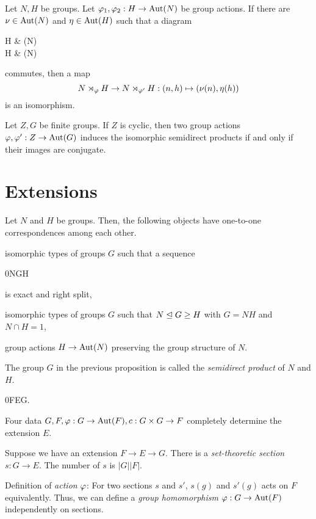 \documentclass{../note}
\begin{document}
\begin{lem}
Let $N,H$ be groups.
Let $\varphi_1,\varphi_2:H\to\operatorname{Aut}(N)$ be group actions.
If there are $\nu\in\operatorname{Aut}(N)$ and $\eta\in\operatorname{Aut}(H)$ such that a diagram
\begin{cd}
H  & \Aut(N) \\
H  & \Aut(N)
\end{cd}
commutes, then a map
\[N\rtimes_\varphi H\to N\rtimes_{\varphi'}H:(n,h)\mapsto(\nu(n),\eta(h))\]
is an isomorphism.
\end{lem}
\begin{lem}
Let $Z,G$ be finite groups.
If $Z$ is cyclic, then two group actions $\varphi,\varphi':Z\to\operatorname{Aut}(G)$ induces the isomorphic semidirect products if and only if their images are conjugate.
\end{lem}


\section{Extensions}

\begin{prop}
Let $N$ and $H$ be groups.
Then, the following objects have one-to-one correspondences among each other.
\begin{parts}
\item isomorphic types of groups $G$ such that a sequence \begin{es}0\>N\>G\>H\end{es} is exact and right split,
\item isomorphic types of groups $G$ such that $N\trianglelefteq G\ge H$ with $G=NH$ and $N\cap H=1$,
\item group actions $H\to\operatorname{Aut}(N)$ preserving the group structure of $N$.
\end{parts}
\end{prop}
\begin{defn}
The group $G$ in the previous proposition is called the \emph{semidirect product} of $N$ and $H$.
\end{defn}


\begin{es}
0\>F\>E\>G.
\end{es}
Four data $G,F,\varphi:G\to\operatorname{Aut}(F),c:G\times G\to F$ completely determine the extension $E$.

Suppose we have an extension $F\to E\to G$.
There is a \emph{set-theoretic section} $s:G\to E$.
The number of $s$ is $|G||F|$.

Definition of \emph{action} $\varphi$:
For two sections $s$ and $s'$, $s(g)$ and $s'(g)$ acts on $F$ equivalently.
Thus, we can define a \emph{group homomorphism} $\varphi:G\to\operatorname{Aut}(F)$ independently on sections.
\end{document}
